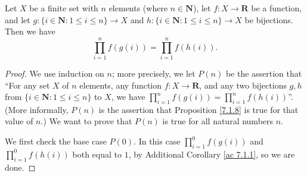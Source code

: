 \begin{additional corollary}\label{ac 7.1.4}
Let \(X\) be a finite set with \(n\) elements (where \(n \in \mathbf{N}\)), let \(f : X \to \mathbf{R}\) be a function, and let \(g : \{i \in \mathbf{N} : 1 \leq i \leq n\} \to X\) and \(h : \{i \in \mathbf{N} : 1 \leq i \leq n\} \to X\) be bijections.
Then we have
\[
    \prod_{i = 1}^n f(g(i)) = \prod_{i = 1}^n f(h(i)).
\]
\end{additional corollary}

\begin{proof}
    We use induction on \(n\);
    more precisely, we let \(P(n)\) be the assertion that ``For any set \(X\) of \(n\) elements, any function \(f : X \to \mathbf{R}\), and any two bijections \(g, h\) from \(\{i \in \mathbf{N} : 1 \leq i \leq n\}\) to \(X\), we have \(\prod_{i = 1}^n f(g(i)) = \prod_{i = 1}^n f(h(i))\)''.
    (More informally, \(P(n)\) is the assertion that Proposition \ref{7.1.8} is true for that value of \(n\).)
    We want to prove that \(P(n)\) is true for all natural numbers \(n\).

    We first check the base case \(P(0)\).
    In this case \(\prod_{i = 1}^0 f(g(i))\) and \(\prod_{i = 1}^0 f(h(i))\) both equal to \(1\), by Additional Corollary \ref{ac 7.1.1}, so we are done.


\end{proof}
